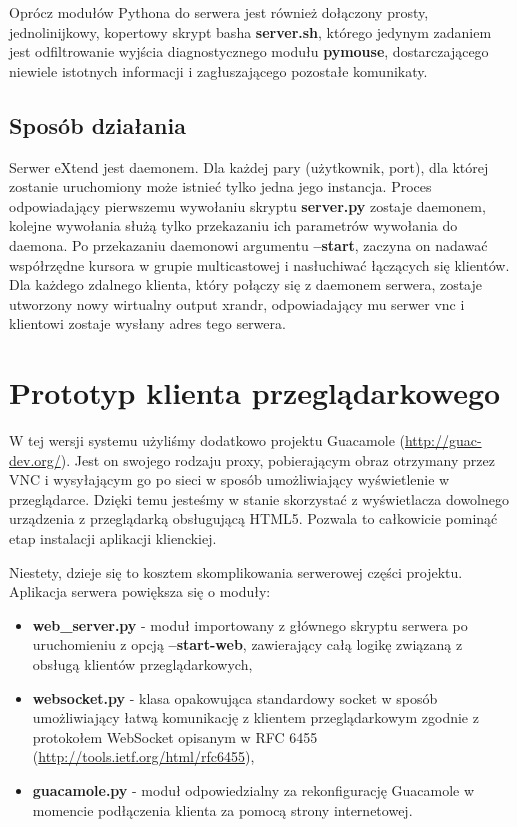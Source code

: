     Oprócz modułów Pythona do serwera jest również dołączony prosty, jednolinijkowy, kopertowy skrypt basha \textbf{server.sh}, którego jedynym zadaniem jest odfiltrowanie wyjścia diagnostycznego modułu \textbf{pymouse}, dostarczającego niewiele istotnych informacji i zagłuszającego pozostałe komunikaty.

  \subsection{Sposób działania}

    Serwer eXtend jest daemonem. Dla każdej pary (użytkownik, port), dla której zostanie uruchomiony może istnieć tylko jedna jego instancja. Proces odpowiadający pierwszemu wywołaniu skryptu \textbf{server.py} zostaje daemonem, kolejne wywołania służą tylko przekazaniu ich parametrów wywołania do daemona. Po przekazaniu daemonowi argumentu \textbf{--start}, zaczyna on nadawać współrzędne kursora w grupie multicastowej i nasłuchiwać łączących się klientów. Dla każdego zdalnego klienta, który połączy się z daemonem serwera, zostaje utworzony nowy wirtualny output xrandr, odpowiadający mu serwer vnc i klientowi zostaje wysłany adres tego serwera.

\section{Prototyp klienta przeglądarkowego}


  W tej wersji systemu użyliśmy dodatkowo projektu Guacamole (\url{http://guac-dev.org/}). Jest on swojego rodzaju proxy, pobierającym obraz otrzymany przez VNC i wysyłającym go po sieci w sposób umożliwiający wyświetlenie w przeglądarce. Dzięki temu jesteśmy w stanie skorzystać z wyświetlacza dowolnego urządzenia z przeglądarką obsługującą HTML5. Pozwala to całkowicie pominąć etap instalacji aplikacji klienckiej.

  Niestety, dzieje się to kosztem skomplikowania serwerowej części projektu. Aplikacja serwera powiększa się o moduły:

  \begin{itemize}
    \item \textbf{web\_server.py} - moduł importowany z głównego skryptu serwera po uruchomieniu z opcją \textbf{--start-web}, zawierający całą logikę związaną z obsługą klientów przeglądarkowych,
    \item \textbf{websocket.py} - klasa opakowująca standardowy socket w sposób umożliwiający łatwą komunikację z klientem przeglądarkowym zgodnie z protokołem WebSocket opisanym w RFC 6455 (\url{http://tools.ietf.org/html/rfc6455}),
    \item \textbf{guacamole.py} - moduł odpowiedzialny za rekonfigurację Guacamole w momencie podłączenia klienta za pomocą strony internetowej.
  \end{itemize}

